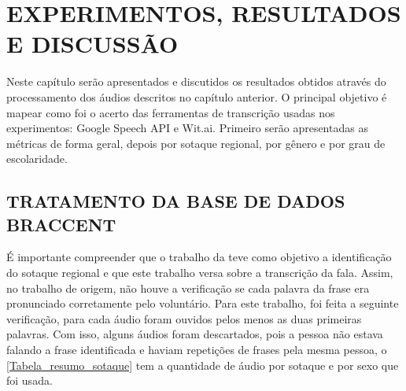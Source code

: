 \chapter[EXPERIMENTOS, RESULTADOS E DISCUSSÃO]{EXPERIMENTOS, RESULTADOS E DISCUSSÃO}

Neste capítulo serão apresentados e discutidos os resultados obtidos através do processamento dos áudios descritos no capítulo anterior. O principal objetivo é mapear como foi o acerto das ferramentas de transcrição usadas nos experimentos: Google Speech API e Wit.ai. Primeiro serão apresentadas as métricas de forma geral, depois por sotaque regional, por gênero e por grau de escolaridade.

\section{TRATAMENTO DA BASE DE DADOS BRACCENT}

É importante compreender que o trabalho da   teve como objetivo a identificação do sotaque regional e que este trabalho versa sobre a transcrição da fala. Assim, no trabalho de origem, não houve a verificação se cada palavra da frase era pronunciado corretamente pelo voluntário. Para este trabalho, foi feita a seguinte verificação, para cada áudio foram ouvidos pelos menos as duas primeiras palavras. Com isso, alguns áudios foram descartados, pois a pessoa não estava falando a frase identificada e haviam repetições de frases pela mesma pessoa, o  \autoref{Tabela_resumo_sotaque} tem a quantidade de áudio por sotaque e por sexo que foi usada. 


